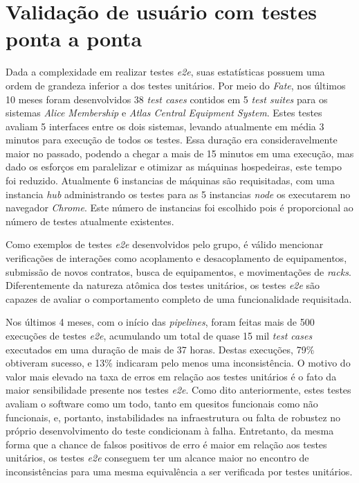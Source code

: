 \hypertarget{fate-resultados}{%
\section{Validação de usuário com testes ponta a ponta}\label{fate-resultados}}

Dada a complexidade em realizar testes \emph{e2e}, suas estatísticas possuem uma ordem de grandeza inferior a dos testes unitários. Por meio do \emph{Fate}, nos últimos 10 meses foram desenvolvidos 38 \emph{test cases} contidos em 5 \emph{test suites} para os sistemas \emph{Alice Membership} e \emph{Atlas Central Equipment System}. Estes testes avaliam 5 interfaces entre os dois sistemas, levando atualmente em média 3 minutos para execução de todos os testes. Essa duração era consideravelmente maior no passado, podendo a chegar a mais de 15 minutos em uma execução, mas dado os esforços em paralelizar e otimizar as máquinas hospedeiras, este tempo foi reduzido. Atualmente 6 instancias de máquinas são requisitadas, com uma instancia \emph{hub} administrando os testes para as 5 instancias \emph{node} os executarem no navegador \emph{Chrome}. Este número de instancias foi escolhido pois é proporcional ao número de testes atualmente existentes.

Como exemplos de testes \emph{e2e} desenvolvidos pelo grupo, é válido mencionar verificações de interações como acoplamento e desacoplamento de equipamentos, submissão de novos contratos, busca de equipamentos, e movimentações de \emph{racks}. Diferentemente da natureza atômica dos testes unitários, os testes \emph{e2e} são capazes de avaliar o comportamento completo de uma funcionalidade requisitada.

Nos últimos 4 meses, com o início das \emph{pipelines}, foram feitas mais de 500 execuções de testes \emph{e2e}, acumulando um total de quase 15 mil \emph{test cases} executados em uma duração de mais de 37 horas. Destas execuções, 79\% obtiveram sucesso, e 13\% indicaram pelo menos uma inconsistência. O motivo do valor mais elevado na taxa de erros em relação aos testes unitários é o fato da maior sensibilidade presente nos testes \emph{e2e}. Como dito anteriormente, estes testes avaliam o software como um todo, tanto em quesitos funcionais como não funcionais, e, portanto, instabilidades na infraestrutura ou falta de robustez no próprio desenvolvimento do teste condicionam à falha. Entretanto, da mesma forma que a chance de falsos positivos de erro é maior em relação aos testes unitários, os testes \emph{e2e} conseguem ter um alcance maior no encontro de inconsistências para uma mesma equivalência a ser verificada por testes unitários.

